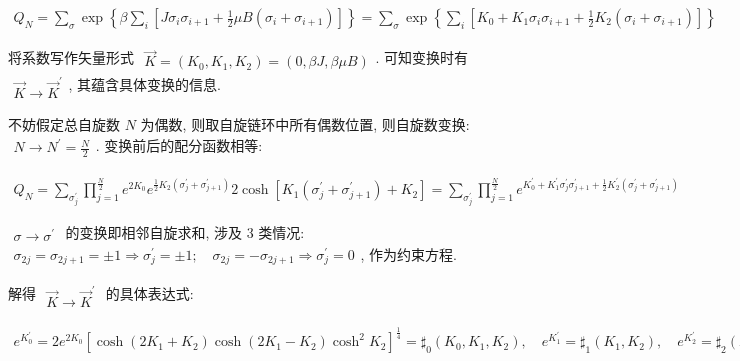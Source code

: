 \documentclass[../../main.tex]{subfiles}
\begin{document}
$\begin{aligned}
    Q_{N} = \sum_{\sigma}\exp{\left\{
        \beta\sum_{i}\left[
            J\sigma_{i}\sigma_{i+1} + \frac{1}{2}\mu B(\sigma_{i}+\sigma_{i+1})
        \right]
    \right\}} 
    = \sum_{\sigma}\exp{\left\{
        \sum_{i} \left[K_{0} + K_{1}\sigma_{i}\sigma_{i+1} + \frac{1}{2}K_{2}(\sigma_{i}+\sigma_{i+1})\right]
    \right\}}
\end{aligned}$

将系数写作矢量形式 $\begin{aligned}
    \vec{K} = (K_{0},K_{1},K_{2}) = (0, \beta J, \beta\mu B) 
\end{aligned}$. 可知变换时有 $\begin{aligned}
    \vec{K}\rightarrow \vec{K}^{\prime}
\end{aligned}$, 其蕴含具体变换的信息. 

不妨假定总自旋数 $N$ 为偶数, 则取自旋链环中所有偶数位置, 则自旋数变换: $\begin{aligned}
    N\rightarrow N^{\prime} = \frac{N}{2}
\end{aligned}$. 变换前后的配分函数相等: 

$\begin{aligned}
    Q_{N} = \sum_{\sigma_{j}^{\prime}}\prod_{j=1}^{\frac{N}{2}}e^{2K_{0}}e^{\frac{1}{2}K_{2}\left(\sigma_{j}^{\prime} + \sigma_{j+1}^{\prime}\right)}2\cosh{\left[
        K_{1}\left(\sigma_{j}^{\prime} + \sigma_{j+1}^{\prime}\right)+K_{2}
    \right]} = \sum_{\sigma_{j}^{\prime}}\prod_{j=1}^{\frac{N}{2}}e^{K_{0}^{\prime}+K_{1}^{\prime}\sigma_{j}^{\prime}\sigma_{j+1}^{\prime}+ \frac{1}{2}K_{2}^{\prime}\left(\sigma_{j}^{\prime}+\sigma_{j+1}^{\prime}\right)}
\end{aligned}$

$\begin{aligned}
    \sigma\rightarrow\sigma^{\prime}
\end{aligned}$ 的变换即相邻自旋求和, 涉及 3 类情况: $\begin{aligned}
    \sigma_{2j} = \sigma_{2j+1} = \pm 1\Rightarrow \sigma_{j}^{\prime} = \pm 1;\quad \sigma_{2j} = -\sigma_{2j+1}\Rightarrow \sigma_{j}^{\prime} = 0
\end{aligned}$, 作为约束方程.

解得 $\begin{aligned}
    \vec{K}\rightarrow\vec{K}^{\prime}
\end{aligned}$ 的具体表达式: 

$\begin{aligned}
    e^{K_{0}^{\prime}} = 2e^{2K_{0}}[
        \cosh{(2K_{1}+K_{2})\cosh{(2K_{1}-K_{2})}}\cosh^{2}{K_{2}}
        ]^{\frac{1}{4}} = \sharp_{0}(K_{0},K_{1},K_{2}),\quad e^{K_{1}^{\prime}} =\sharp_{1}(K_{1},K_{2}),\quad e^{K_{2}^{\prime}} = \sharp_{2}(K_{1},K_{2})
\end{aligned}$
\end{document}
